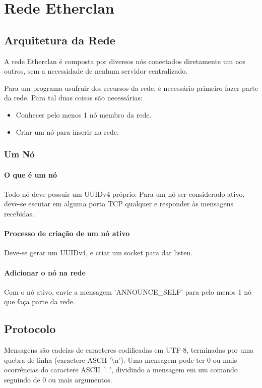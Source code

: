 \chapter{Rede Etherclan}
\label{sec:etherclan}

\section{Arquitetura da Rede}
\label{sec:etherclan:rede}

  A rede Etherclan é composta por diversos nós conectados diretamente um nos outros, sem a necessidade
  de nenhum servidor centralizado.
  
  Para um programa usufruir dos recursos da rede, é necessário primeiro fazer parte da rede. Para 
  tal duas coisas são necessárias:
  
  \begin{itemize}
    \item Conhecer pelo menos 1 nó membro da rede.
    \item Criar um nó para inserir na rede.
  \end{itemize}
  
  \subsection{Um Nó}
    \subsubsection{O que é um nó}
      Todo nó deve possuir um UUIDv4 próprio.
      Para um nó ser considerado ativo, deve-se escutar em alguma porta TCP qualquer e responder às
      mensagens recebidas.
      
    \subsubsection{Processo de criação de um nó ativo}
      Deve-se gerar um UUIDv4, e criar um socket para dar listen.

    \subsubsection{Adicionar o nó na rede}
      Com o nó ativo, envie a mensagem 'ANNOUNCE\_SELF' para pelo menos 1 nó que faça parte da rede.

\section{Protocolo}
  Mensagens são cadeias de caracteres codificadas em UTF-8, terminadas por uma quebra de linha
  (caractere ASCII '\textbackslash n'). Uma mensagem pode ter 0 ou mais ocorrências do caractere
  ASCII~'~', dividindo a mensagem em um comando seguindo de 0 ou mais argumentos.

